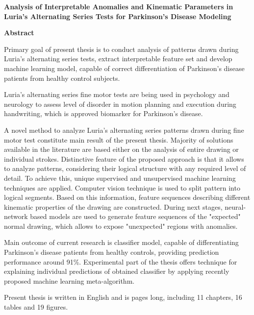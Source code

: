 \begin{titlepage}
\begin{center}

{\large \textbf{Analysis of Interpretable Anomalies and Kinematic Parameters in Luria's Alternating Series Tests for Parkinson's Disease Modeling}}

\vspace*{1cm}

{\Large \textbf{Abstract}}

\vspace*{1cm}

\end{center}


Primary goal of present thesis is to conduct analysis of patterns drawn during Luria’s alternating series tests, extract interpretable feature set and develop machine learning model, capable of correct differentiation of Parkinson’s disease patients from healthy control subjects.

Luria’s alternating series fine motor tests are being used in psychology and neurology to assess level of disorder in motion planning and execution during handwriting, which is approved biomarker for Parkinson’s disease.

A novel method to analyze Luria’s alternating series patterns drawn during fine motor test constitute main result of the present thesis. Majority of solutions available in the literature are based either on the analysis of entire drawing or individual strokes. Distinctive feature of the proposed approach is that it allows to analyze patterns, considering their logical structure with any required level of detail. To achieve this, unique supervised and unsupervised machine learning techniques are applied. Computer vision technique is used to split pattern into logical segments. Based on this information, feature sequences describing different kinematic properties of the drawing are constructed. During next stages, neural-network based models are used to generate feature sequences of the "expected" normal drawing, which allows to expose "unexpected" regions with anomalies. 

Main outcome of current research is classifier model, capable of differentiating Parkinson's disease patients from healthy controls, providing prediction performance around 91\%. Experimental part of the thesis offers technique for explaining individual predictions of obtained classifier by applying recently proposed machine learning meta-algorithm.

Present thesis is written in English and is \pageref{LastPage} pages long, including 11 chapters, 16 tables and 19 figures.


\end{titlepage}



